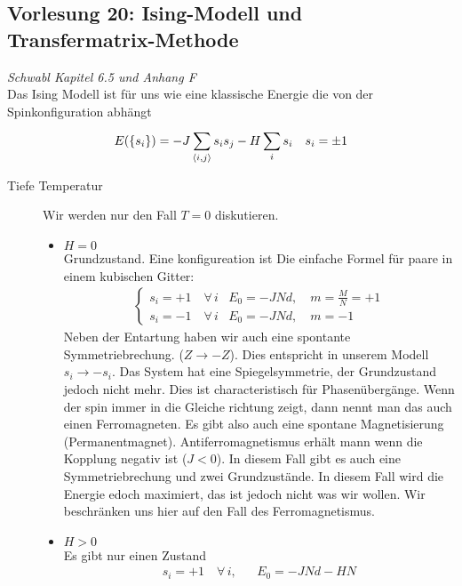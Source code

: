 \subsection*{Vorlesung 20: Ising-Modell und Transfermatrix-Methode}
\emph{Schwabl Kapitel 6.5 und Anhang F} \\
Das Ising Modell ist für uns wie eine klassische Energie die von der Spinkonfiguration
abhängt
%
\begin{align*}
  E(\{s_i\}) = - J \sum_{\Braket{i,j}}^{} s_i s_j - H \sum_{i}^{} s_i && s_i = \pm 1
\end{align*}
%
\begin{description}
  \item[Tiefe Temperatur] Wir werden nur den Fall $T=0$ diskutieren.
    \begin{itemize}
      \item $H=0$ \\ Grundzustand.  Eine konfigureation ist
        Die einfache Formel für paare in einem kubischen Gitter:
        \begin{align*}
          \begin{cases}
            s_i = + 1 \quad\forall\,i & E_0 = - J N d, \quad m = \frac{M}{N} = +1 \\
            s_i = - 1 \quad\forall\, i & E_0 = - J N d, \quad m = -1 
          \end{cases} 
        \end{align*}
        Neben der Entartung haben wir auch eine spontante Symmetriebrechung.
        ($Z \to - Z$). Dies entspricht in unserem Modell $s_i \to - s_i$.
        Das System hat eine Spiegelsymmetrie, der Grundzustand jedoch nicht mehr.
        Dies ist characteristisch für Phasenübergänge. Wenn der spin immer in die Gleiche
        richtung zeigt, dann nennt man das auch einen Ferromagneten. Es gibt also
        auch eine spontane Magnetisierung (Permanentmagnet). Antiferromagnetismus
        erhält mann wenn die Kopplung negativ ist ($J< 0$). In diesem Fall gibt es auch
        eine Symmetriebrechung und zwei Grundzustände. In diesem Fall wird die Energie
        edoch maximiert, das ist jedoch nicht was wir wollen. Wir beschränken
        uns hier auf den Fall des Ferromagnetismus.
      \item $H > 0$ \\
        Es gibt nur einen Zustand 
        \begin{align*}
          s_i = +1 \quad\forall\, i, && E_0 = - J N d - H N
        \end{align*}

\end{itemize}
\end{description}
